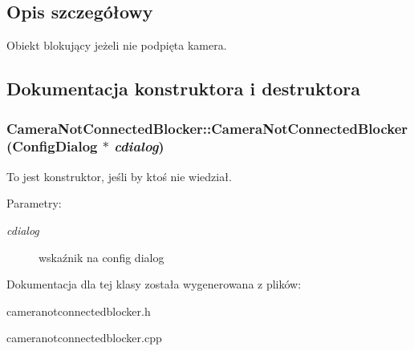 \subsection{Opis szczegółowy}
Obiekt blokujący jeżeli nie podpięta kamera. 

\subsection{Dokumentacja konstruktora i destruktora}
\hypertarget{class_camera_not_connected_blocker_36847155966f5fded3d9d5ae9a348be7}{
\subsubsection[{CameraNotConnectedBlocker}]{\setlength{\rightskip}{0pt plus 5cm}CameraNotConnectedBlocker::CameraNotConnectedBlocker ({\bf ConfigDialog} $\ast$ {\em cdialog})}}
\label{class_camera_not_connected_blocker_36847155966f5fded3d9d5ae9a348be7}


To jest konstruktor, jeśli by ktoś nie wiedział. 

\begin{Desc}
\item[Parametry:]
\begin{description}
\item[{\em cdialog}]wskaźnik na config dialog \end{description}
\end{Desc}


Dokumentacja dla tej klasy została wygenerowana z plików:\begin{CompactItemize}
\item 
cameranotconnectedblocker.h\item 
cameranotconnectedblocker.cpp\end{CompactItemize}
